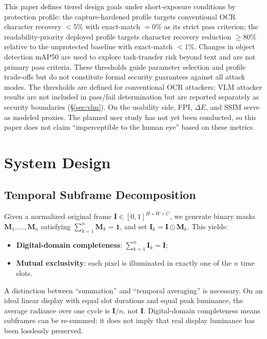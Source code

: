 \documentclass{ieeeaccess}
\begin{document}
This paper defines tiered design goals under short-exposure conditions by protection profile: the capture-hardened profile targets conventional OCR character recovery $<5\%$ with exact-match $=0\%$ as its strict pass criterion; the readability-priority deployed profile targets character recovery reduction $\geq$80\% relative to the unprotected baseline with exact-match $<1\%$. Changes in object detection mAP50 are used to explore task-transfer risk beyond text and are not primary pass criteria. These thresholds guide parameter selection and profile trade-offs but do not constitute formal security guarantees against all attack modes. The thresholds are defined for conventional OCR attackers; VLM attacker results are not included in pass/fail determination but are reported separately as security boundaries (\S\ref{sec:vlm}). On the usability side, FPI, $\Delta E$, and SSIM serve as modeled proxies. The planned user study has not yet been conducted, so this paper does not claim ``imperceptible to the human eye'' based on these metrics.


\section{System Design}
\label{sec:method}

\subsection{Temporal Subframe Decomposition}

Given a normalized original frame $\mathbf{I}\in[0,1]^{H\times W\times C}$, we generate binary masks $\mathbf{M}_1,\ldots,\mathbf{M}_n$ satisfying $\sum_{k=1}^{n}\mathbf{M}_k=\mathbf{1}$, and set $\mathbf{I}_k=\mathbf{I}\odot\mathbf{M}_k$. This yields:
\begin{itemize}
\item \textbf{Digital-domain completeness}: $\sum_{k=1}^{n}\mathbf{I}_k = \mathbf{I}$;
\item \textbf{Mutual exclusivity}: each pixel is illuminated in exactly one of the $n$ time slots.
\end{itemize}
A distinction between ``summation'' and ``temporal averaging'' is necessary. On an ideal linear display with equal slot durations and equal peak luminance, the average radiance over one cycle is $\mathbf{I}/n$, not $\mathbf{I}$. Digital-domain completeness means subframes can be re-summed; it does not imply that real display luminance has been losslessly preserved.
\end{document}
